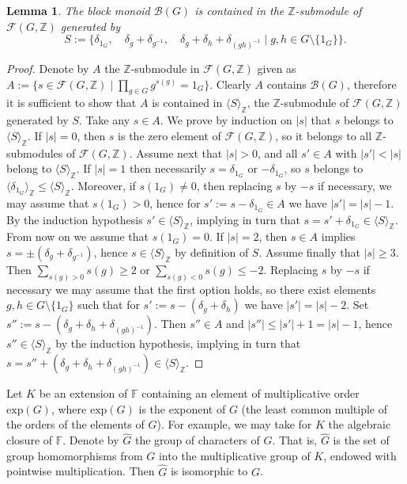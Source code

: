 \documentclass[12pt, oneside]{amsart}
\newtheorem{lemma}[theorem]{\bf Lemma}
\def\field{K}
\def\ZZ{\mathbb{Z}}
\def\FF{\mathbb{F}}
\begin{document}
\begin{lemma}\label{lemma:length 3 generators} 
The block monoid $\mathcal{B}(G)$ is contained in the $\ZZ$-submodule of $\mathcal{F}(G,\ZZ)$ 
generated by 
\begin{equation}\label{eq:S} 
S:=\{\delta_{1_G},\quad \delta_g+\delta_{g^{-1}}, \quad \delta_g+\delta_h+\delta_{(gh)^{-1}}\mid g,h\in G\setminus \{1_G\}\}.\end{equation} 
\end{lemma} 

\begin{proof}
Denote by $A$ the $\ZZ$-submodule in $\mathcal{F}(G,\ZZ)$ given as 
$A:=\{s\in \mathcal{F}(G,\ZZ)\mid \prod_{g\in G}g^{s(g)}=1_G\}$. 
Clearly $A$ contains $\mathcal{B}(G)$, therefore it is sufficient to show that 
$A$ is contained in $\langle S\rangle_\ZZ$, the $\ZZ$-submodule of $\mathcal{F}(G,\ZZ)$ generated by $S$. Take any $s\in A$. We prove by induction on $|s|$ that  $s$ belongs to 
$\langle S\rangle_\ZZ$. If $|s|=0$, then $s$ is the zero element of $\mathcal{F}(G,\ZZ)$, so it belongs to all $\ZZ$-submodules of $\mathcal{F}(G,\ZZ)$. Assume next that $|s|>0$, and all $s'\in A$ 
with $|s'|<|s|$ belong to $\langle S\rangle_\ZZ$. 
If $|s|=1$ then necessarily $s=\delta_{1_G}$ or 
$-\delta_{1_G}$, so $s$ belongs to $\langle \delta_{1_G}\rangle_\ZZ\le \langle S\rangle_\ZZ$. Moreover, if $s(1_G)\neq 0$, then replacing $s$ by $-s$ if necessary, 
we may assume that $s(1_G)>0$, hence for $s':=s-\delta_{1_G}\in A$ we have $|s'|=|s|-1$. By the induction 
hypothesis $s'\in \langle S\rangle_\ZZ$, implying in turn that 
$s=s'+\delta_{1_G}\in \langle S\rangle_\ZZ$. 
From now on we assume 
that $s(1_G)=0$. If $|s|=2$, then $s\in A$ implies $s=\pm(\delta_g+\delta_{g^{-1}})$, hence 
$s\in \langle S\rangle_\ZZ$ by definition of $S$. 
Assume finally that $|s|\ge 3$. Then $\sum_{s(g)>0}s(g)\ge 2$ or 
$\sum_{s(g)<0}s(g)\le -2$. Replacing $s$ by $-s$ if necessary we may assume 
that the first option holds, so there exist elements $g,h\in G\setminus \{1_G\}$ such that 
for $s':=s-(\delta_g+\delta_h)$ we have $|s'|=|s|-2$. 
Set $s'':=s-(\delta_g+\delta_h+\delta_{(gh)^{-1}})$. Then $s''\in A$ and $|s''|\le |s'|+1=|s|-1$, 
hence $s''\in \langle S\rangle_\ZZ$ by the induction hypothesis, implying in turn that 
$s=s''+(\delta_g+\delta_h+\delta_{(gh)^{-1}})\in \langle S\rangle_\ZZ$. 
\end{proof} 

Let $\field$ be  an extension of $\FF$ containing an element of multiplicative order $\mathrm{exp}(G)$, 
where $\mathrm{exp}(G)$ is the exponent of $G$ (the least common multiple of the orders of the elements of $G$). 
For example, we may take for $\field$ the algebraic closure of $\FF$. 
Denote by $\widehat G$ the group of characters of $G$. That is, 
$\widehat G$ is the set of group homomorphisms from $G$ into the multiplicative 
group of $\field$, endowed with pointwise multiplication. 
Then $\widehat G$ is isomorphic to $G$. 
\end{document}
